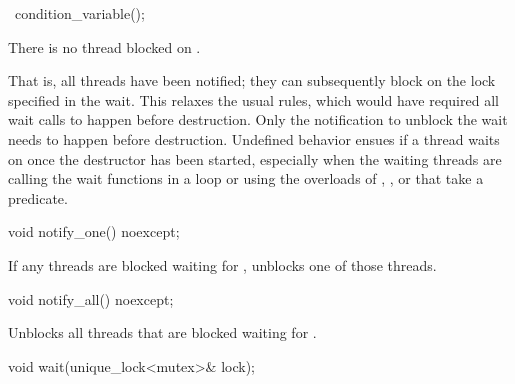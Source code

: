 %
\begin{itemdecl}
~condition_variable();
\end{itemdecl}

\begin{itemdescr}
\pnum
\expects
There is no thread blocked on .
\begin{note}
That is, all
threads have been notified; they can subsequently block on the lock specified in the
wait.
This relaxes the usual rules, which would have required all wait calls to happen before
destruction. Only the notification to unblock the wait needs to happen before destruction.
Undefined behavior ensues if a thread waits on  once the destructor has
been started, especially when the waiting threads are calling the wait functions in a loop or
using the overloads of , , or  that take a predicate.
\end{note}
\end{itemdescr}

%
\begin{itemdecl}
void notify_one() noexcept;
\end{itemdecl}

\begin{itemdescr}
\pnum
\effects
If any threads are blocked waiting for , unblocks one of those threads.
\end{itemdescr}

%
\begin{itemdecl}
void notify_all() noexcept;
\end{itemdecl}

\begin{itemdescr}
\pnum
\effects
Unblocks all threads that are blocked waiting for .
\end{itemdescr}

%
\begin{itemdecl}
void wait(unique_lock<mutex>& lock);
\end{itemdecl}

